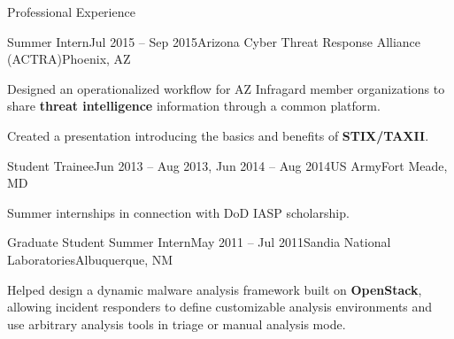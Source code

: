 
\begin{rSection}{Professional Experience}


\begin{rExperienceBullets}{Summer Intern}{Jul 2015 -- Sep 2015}{Arizona Cyber Threat Response Alliance (ACTRA)}{Phoenix, AZ}

	\item Designed an operationalized workflow for AZ Infragard member organizations to share {\bf threat intelligence} information through a common platform.

	\item Created a presentation introducing the basics and benefits of {\bf STIX/TAXII}.

\end{rExperienceBullets}


\begin{rExperienceBullets}{Student Trainee}{Jun 2013 -- Aug 2013, Jun 2014 -- Aug 2014}{US Army}{Fort Meade, MD}

	\item Summer internships in connection with DoD IASP scholarship.

\end{rExperienceBullets}


\begin{rExperienceBullets}{Graduate Student Summer Intern}{May 2011 -- Jul 2011}{Sandia National Laboratories}{Albuquerque, NM}

	\item Helped design a dynamic malware analysis framework built on \textbf{OpenStack}, allowing incident responders to define customizable analysis environments and use arbitrary analysis tools in triage or manual analysis mode.



\end{rExperienceBullets}
\end{rSection}

